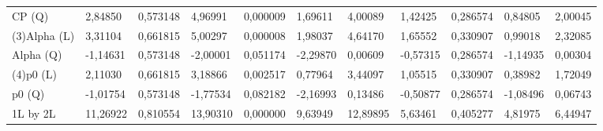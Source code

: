\begin{table}[H]
{\begin{tabular}{lllllllllll}
\rowcolor[HTML]{FFFFFF} 
{\color[HTML]{000000} CP      (Q)}    & {\color[HTML]{FF0000} 2,84850}  & {\color[HTML]{FF0000} 0,573148} & {\color[HTML]{FF0000} 4,96991}  & {\color[HTML]{FF0000} 0,000009} & {\color[HTML]{FF0000} 1,69611}        & {\color[HTML]{FF0000} 4,00089}        & {\color[HTML]{FF0000} 1,42425}  & {\color[HTML]{FF0000} 0,286574}      & {\color[HTML]{FF0000} 0,84805}        & {\color[HTML]{FF0000} 2,00045}        \\
\rowcolor[HTML]{FFFFFF} 
{\color[HTML]{000000} (3)Alpha   (L)} & {\color[HTML]{FF0000} 3,31104}  & {\color[HTML]{FF0000} 0,661815} & {\color[HTML]{FF0000} 5,00297}  & {\color[HTML]{FF0000} 0,000008} & {\color[HTML]{FF0000} 1,98037}        & {\color[HTML]{FF0000} 4,64170}        & {\color[HTML]{FF0000} 1,65552}  & {\color[HTML]{FF0000} 0,330907}      & {\color[HTML]{FF0000} 0,99018}        & {\color[HTML]{FF0000} 2,32085}        \\
\rowcolor[HTML]{FFFFFF} 
{\color[HTML]{000000} Alpha   (Q)}    & {\color[HTML]{000000} -1,14631} & {\color[HTML]{000000} 0,573148} & {\color[HTML]{000000} -2,00001} & {\color[HTML]{000000} 0,051174} & {\color[HTML]{000000} -2,29870}       & {\color[HTML]{000000} 0,00609}        & {\color[HTML]{000000} -0,57315} & {\color[HTML]{000000} 0,286574}      & {\color[HTML]{000000} -1,14935}       & {\color[HTML]{000000} 0,00304}        \\
\rowcolor[HTML]{FFFFFF} 
{\color[HTML]{000000} (4)p0      (L)} & {\color[HTML]{FF0000} 2,11030}  & {\color[HTML]{FF0000} 0,661815} & {\color[HTML]{FF0000} 3,18866}  & {\color[HTML]{FF0000} 0,002517} & {\color[HTML]{FF0000} 0,77964}        & {\color[HTML]{FF0000} 3,44097}        & {\color[HTML]{FF0000} 1,05515}  & {\color[HTML]{FF0000} 0,330907}      & {\color[HTML]{FF0000} 0,38982}        & {\color[HTML]{FF0000} 1,72049}        \\
\rowcolor[HTML]{FFFFFF} 
{\color[HTML]{000000} p0      (Q)}    & {\color[HTML]{000000} -1,01754} & {\color[HTML]{000000} 0,573148} & {\color[HTML]{000000} -1,77534} & {\color[HTML]{000000} 0,082182} & {\color[HTML]{000000} -2,16993}       & {\color[HTML]{000000} 0,13486}        & {\color[HTML]{000000} -0,50877} & {\color[HTML]{000000} 0,286574}      & {\color[HTML]{000000} -1,08496}       & {\color[HTML]{000000} 0,06743}        \\
\rowcolor[HTML]{FFFFFF} 
{\color[HTML]{000000} 1L by 2L}       & {\color[HTML]{FF0000} 11,26922} & {\color[HTML]{FF0000} 0,810554} & {\color[HTML]{FF0000} 13,90310} & {\color[HTML]{FF0000} 0,000000} & {\color[HTML]{FF0000} 9,63949}        & {\color[HTML]{FF0000} 12,89895}       & {\color[HTML]{FF0000} 5,63461}  & {\color[HTML]{FF0000} 0,405277}      & {\color[HTML]{FF0000} 4,81975}        & {\color[HTML]{FF0000} 6,44947}        \\

\end{tabular}}
\end{table}
